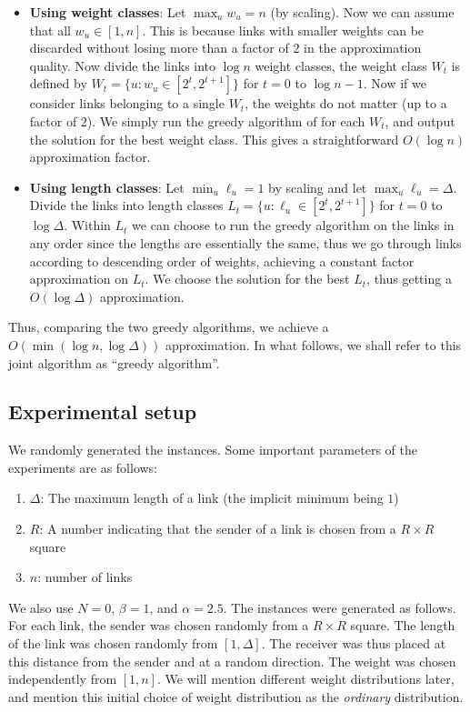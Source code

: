 \documentclass[11pt]{amsart}
\begin{document}
\begin{itemize}
\item {\bf Using weight classes}: Let $\max_u w_u = n$ (by scaling). Now we can assume that all $w_u \in [1, n]$. This is because links with smaller weights can be discarded without losing more than a factor of $2$ in the approximation quality. Now divide the links into
$\log n$ weight classes, the weight class $W_t$ is defined by $W_t = \{u : w_u \in [2^t, 2^{t+1}]\}$ for $t = 0$ to $\log n -1$. Now if we consider links belonging to a single $W_t$, the weights do not matter (up to a factor of 2). We simply run the greedy algorithm of \cite{SODA11} for each $W_t$, and output the solution for the best weight class. This gives a straightforward $O(\log n)$ approximation factor.
\item {\bf Using length classes}: Let $\min_u \ell_u = 1$ by scaling and let $\max_u \ell_u = \Delta$. Divide the links
into length classes $L_t = \{u : \ell_u \in [2^t, 2^{t+1}]\}$ for $t = 0$ to $\log \Delta$. Within $L_t$ we can choose to run the greedy algorithm on the links in any order since the lengths are essentially the same, thus we go through links according to descending order of weights, achieving a constant factor approximation on $L_t$. We choose the solution for the best $L_t$, thus getting a $O(\log \Delta)$ approximation.
\end{itemize}
Thus, comparing the two greedy algorithms, we achieve a $O(\min(\log
n, \log \Delta))$ approximation. In what follows, we shall refer to
this joint algorithm as 
``greedy algorithm''.

\subsection*{Experimental setup}
We randomly generated the instances. Some important parameters of the experiments are as follows:
\begin{enumerate}
\item $\Delta$: The maximum length of a link (the implicit minimum being $1$)
\item $R$: A number  indicating that the sender of a link is chosen
  from a $R \times R$ square
\item $n$: number of links
\end{enumerate}
We also use $N=0$, $\beta=1$, and $\alpha = 2.5$.
The instances were generated as follows. For each link, the sender was chosen randomly from a $R \times R$ square. The length of the link was chosen randomly from $[1, \Delta]$. The receiver was thus placed at this distance from the sender and at a random direction. The weight was chosen independently from $[1, n]$. We will mention different weight distributions later, and mention this initial choice of weight distribution as the \emph{ordinary} distribution.
\end{document}
